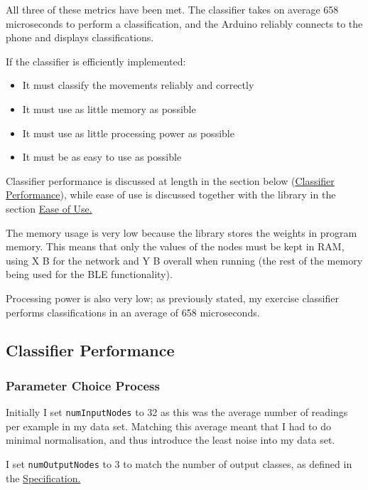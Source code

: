 \documentclass[a4paper]{article}
\begin{document}
All three of these metrics have been met. The classifier takes on average 658 microseconds\cite{dsref0} to perform a classification, and the Arduino reliably connects to the phone and displays classifications.

If the classifier is efficiently implemented:

\begin{itemize}
\item It must classify the movements reliably and correctly
\item It must use as little memory as possible
\item It must use as little processing power as possible
\item It must be as easy to use as possible
\end{itemize}

Classifier performance is discussed at length in the section below (\hyperref[subsec:ev_cp]{Classifier Performance}), while ease of use is discussed together with the library in the section \hyperref[subsec:ev_eu]{Ease of Use.}

The memory usage is very low because the library stores the weights in program memory. This means that only the values of the nodes must be kept in RAM, using X B for the network and Y B  overall when running (the rest of the memory being used for the BLE functionality).

Processing power is also very low; as previously stated, my exercise classifier performs classifications in an average of 658 microseconds\cite{dsref0}. 

\subsection{Classifier Performance}%
\label{subsec:ev_cp}

\subsubsection{Parameter Choice Process}%
\label{subsubsec:ev_cp_parameterchoiceprocess}

Initially I set \lstinline{numInputNodes} to 32 as this was the average number of readings per example in my data set. Matching this average meant that I had to do minimal normalisation, and thus introduce the least noise into my data set.

I set \lstinline{numOutputNodes} to 3 to match the number of output classes, as defined in the \hyperref[subsubsec:dc_dc_classes]{Specification.}
\end{document}
